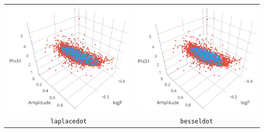 \begin{longtable}{ c c }
	\includegraphics[width=0.3\paperwidth]{images/ksvm_laplacedot.png} & \includegraphics[width=0.3\paperwidth]{images/ksvm_besseldot.png} \\
	\verb|laplacedot| & \verb|besseldot| \\

\end{longtable}
